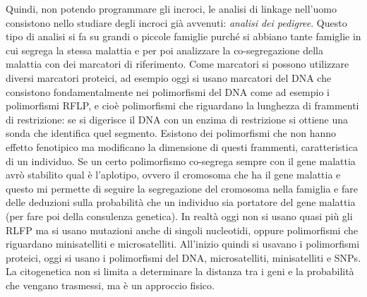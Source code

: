 \documentclass[11pt]{book}
\begin{document}
\begin{enumerate}
\begin{itemize}
Quindi, non potendo programmare gli incroci, le analisi di linkage nell’uomo consistono nello studiare degli incroci già avvenuti: \emph{analisi dei pedigree}. Questo tipo di analisi si fa su grandi o piccole famiglie purché si abbiano tante famiglie in cui segrega la stessa malattia e per poi analizzare la co-segregazione della malattia con dei marcatori di riferimento. Come marcatori si possono utilizzare diversi marcatori proteici, ad esempio oggi si usano marcatori del DNA che consistono fondamentalmente nei polimorfismi del DNA come ad esempio i polimorfismi RFLP, e cioè polimorfismi che riguardano la lunghezza di frammenti di restrizione: se si digerisce il DNA con un enzima di restrizione si ottiene una sonda che identifica quel segmento. Esistono dei polimorfismi che non hanno effetto fenotipico ma modificano la dimensione di questi frammenti, caratteristica di un individuo. Se un certo polimorfismo co-segrega sempre con il gene malattia avrò stabilito qual è l’aplotipo, ovvero il cromosoma che ha il gene malattia e questo mi permette di seguire la segregazione del cromosoma nella famiglia e fare delle deduzioni sulla probabilità che un individuo sia portatore del gene malattia (per fare poi della consulenza genetica). In realtà oggi non si usano quasi più gli RLFP ma si usano mutazioni anche di singoli nucleotidi, oppure polimorfismi che riguardano minisatelliti e microsatelliti. All’inizio quindi si usavano i polimorfismi proteici, oggi si usano i polimorfismi del DNA, microsatelliti, minisatelliti e SNPs. La citogenetica non si limita a determinare la distanza tra i geni e la probabilità che vengano trasmessi, ma è un approccio fisico.
\end{itemize}


\end{enumerate}
\end{document}
